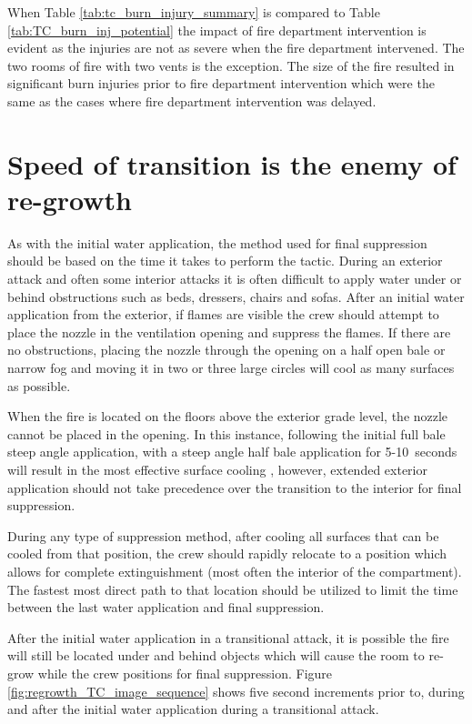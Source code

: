 \documentclass[12pt,oneside]{book}
\begin{document}
When Table \ref{tab:tc_burn_injury_summary} is compared to Table \ref{tab:TC_burn_inj_potential} the impact of fire department intervention is evident as the injuries are not as severe when the fire department intervened. The two rooms of fire with two vents is the exception. The size of the fire resulted in significant burn injuries prior to fire department intervention which were the same as the cases where fire department intervention was delayed. 

\section{Speed of transition is the enemy of re-growth} \label{tc:speed_enemy_regrowth}
As with the initial water application, the method used for final suppression should be based on the time it takes to perform the tactic. During an exterior attack and often some interior attacks it is often difficult to apply water under or behind obstructions such as beds, dressers, chairs and sofas. After an initial water application from the exterior, if flames are visible the crew should attempt to place the nozzle in the ventilation opening and suppress the flames. If there are no obstructions, placing the nozzle through the opening on a half open bale or narrow fog and moving it in two or three large circles will cool as many surfaces as possible. 

When the fire is located on the floors above the exterior grade level, the nozzle cannot be placed in the opening. In this instance, following the initial full bale steep angle application, with a steep angle half bale application for 5-10~seconds will result in the most effective surface cooling \cite{Weinchenk_watermapping}, however, extended exterior application should not take precedence over the transition to the interior for final suppression.  

During any type of suppression method, after cooling all surfaces that can be cooled from that position, the crew should rapidly relocate to a position which allows for complete extinguishment (most often the interior of the compartment). The fastest most direct path to that location should be utilized to limit the time between the last water application and final suppression. 

After the initial water application in a transitional attack, it is possible the fire will still be located under and behind objects which will cause the room to re-grow while the crew positions for final suppression. Figure \ref{fig:regrowth_TC_image_sequence} shows five second increments prior to, during and after the initial water application during a transitional attack. 
\end{document}
